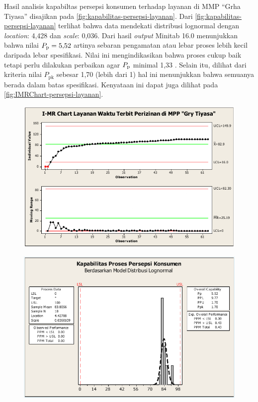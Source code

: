 Hasil analisis kapabiltas persepsi konsumen terhadap layanan di MMP ``Grha Tiyasa'' disajikan pada \autoref{fig:kapabilitas-persepsi-layanan}. Dari \autoref{fig:kapabilitas-persepsi-layanan} terlihat bahwa data mendekati distribusi lognormal dengan \textit{location}: 4,428 dan \textit{scale}: 0,036. Dari hasil \textit{output} Minitab 16.0 menunjukkan bahwa nilai $P_{\mathrm{p}} = 5{,}52$ artinya sebaran pengamatan atau lebar proses lebih kecil daripada lebar spesifikasi. Nilai ini mengindikasikan bahwa proses cukup baik tetapi perlu dilakukan perbaikan agar $P_{\mathrm{p}}$ minimal 1,33 \cite{gasperz2004production}. Selain itu, dilihat dari kriteria nilai $P_{\mathrm{pk}}$ sebesar 1,70 (lebih dari 1) hal ini menunjukkan bahwa semuanya berada dalam batas spesifikasi. Kenyataan ini dapat juga dilihat pada \autoref{fig:IMRChart-persepsi-layanan}.

\begin{figure}[H]
    \centering
    \includegraphics[width=.7\linewidth]{pdf/I-MR-chart-pada-layanan-waktu-terbit-perizinan-di-MMP-Grha-Tiyasa.pdf}
    \label{fig:IMRChart-proses-terbit-izin}
\end{figure}

\begin{figure}[H]
    \centering
    \includegraphics[width=.7\linewidth]{pdf/Analisis-kapabilitas-proses-persepsi-konsumen-terhadap-layanan-di-MMP-Grha-Tiyasa.pdf}
    \label{fig:kapabilitas-persepsi-layanan}
\end{figure}

